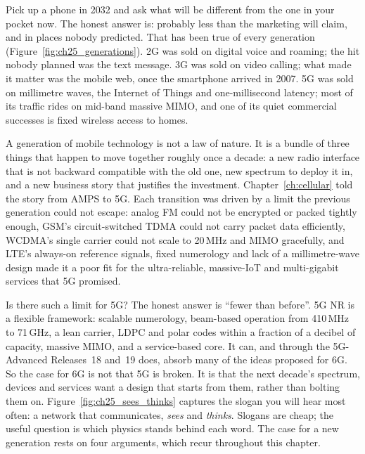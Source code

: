 Pick up a phone in 2032 and ask what will be different from the one in your pocket now. The honest
answer is: probably less than the marketing will claim, and in places nobody predicted. That has
been true of every generation (Figure~\ref{fig:ch25_generations}). 2G was sold on digital voice and
roaming; the hit nobody planned was the text message. 3G was sold on video calling; what made it
matter was the mobile web, once the smartphone arrived in 2007. 5G was sold on millimetre waves,
the Internet of Things and one-millisecond latency; most of its traffic rides on mid-band massive
MIMO, and one of its quiet commercial successes is fixed wireless access to homes.


A generation of mobile technology is not a law of nature. It is a bundle of three things that
happen to move together roughly once a decade: a new radio interface that is not backward compatible
with the old one, new spectrum to deploy it in, and a new business story that justifies the
investment. Chapter~\ref{ch:cellular} told the story from AMPS to 5G. Each transition was driven by
a limit the previous generation could not escape: analog FM could not be encrypted or packed tightly
enough, GSM's circuit-switched TDMA could not carry packet data efficiently, WCDMA's single carrier
could not scale to 20\,MHz and MIMO gracefully, and LTE's always-on reference signals, fixed numerology
and lack of a millimetre-wave design made it a poor fit for the ultra-reliable, massive-IoT and
multi-gigabit services that 5G promised.

Is there such a limit for 5G? The honest answer is ``fewer than before''. 5G NR is a flexible
framework: scalable numerology, beam-based operation from 410\,MHz to 71\,GHz, a lean carrier, LDPC
and polar codes within a fraction of a decibel of capacity, massive MIMO, and a service-based core.
It can, and through the 5G-Advanced Releases~18 and~19 does, absorb many of the ideas proposed for
6G. So the case for 6G is not that 5G is broken. It is that the next decade's spectrum, devices and
services want a design that starts from them, rather than bolting them on. Figure~\ref{fig:ch25_sees_thinks}
captures the slogan you will hear most often: a network that communicates, \emph{sees} and
\emph{thinks}. Slogans are cheap; the useful question is which physics stands behind each word.
The case for a new generation rests on four arguments, which recur throughout this chapter.

